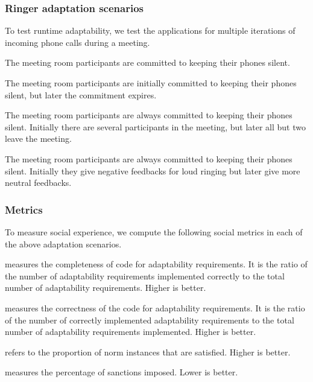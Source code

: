 \subsubsection*{Ringer adaptation scenarios}

To test runtime adaptability, we test the applications for
multiple iterations of incoming phone calls during a meeting.

\begin{description}[leftmargin=1em]
\item[Norms fixed.] 
The meeting room participants are committed to keeping their 
phones silent.

\item[Change in norms.] 
The meeting room participants are initially committed to keeping their
phones silent, but later the commitment expires. 

\item[Change in context.] 
The meeting room participants are always committed to keeping their
phones silent. Initially there are several participants in the meeting, but later
all but two leave the meeting.

\item[Change in sanction.] 
The meeting room participants are always committed to keeping their 
phones silent. Initially they give negative feedbacks for loud ringing
but later give more neutral feedbacks. 
\end{description}


\subsubsection*{Metrics}

To measure social experience, we compute the following social metrics
in each of the above adaptation scenarios. 
\begin{description}[leftmargin=1em] 
\item[Adaptability coverage] measures the completeness of code for
adaptability requirements. It is the ratio of the number of adaptability
requirements implemented correctly to the total number of adaptability
requirements. Higher is better.

\item[Adaptability correctness] measures the correctness of the code for
adaptability requirements. It is the ratio of the number of correctly 
implemented adaptability requirements to the total number of adaptability
requirements implemented. Higher is better.

\item[Norm compliance] refers to the proportion of norm instances that
are satisfied. Higher is better.

\item[Sanction proportion] measures the percentage of sanctions imposed.
Lower is better.
\end{description}

